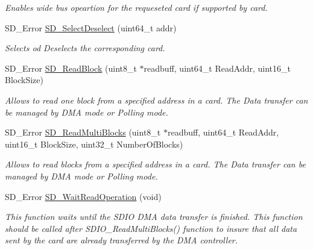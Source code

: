 \begin{DoxyCompactItemize}
\begin{DoxyCompactList}\small\item\em Enables wide bus opeartion for the requeseted card if supported by card. \end{DoxyCompactList}\item 
S\+D\+\_\+\+Error \hyperlink{group___s_t_m324x_g___e_v_a_l___s_d_i_o___s_d___private___functions_ga849eb0b385337453139a7567898dacb7}{S\+D\+\_\+\+Select\+Deselect} (uint64\+\_\+t addr)
\begin{DoxyCompactList}\small\item\em Selects od Deselects the corresponding card. \end{DoxyCompactList}\item 
S\+D\+\_\+\+Error \hyperlink{group___s_t_m324x_g___e_v_a_l___s_d_i_o___s_d___private___functions_ga1b2b4c1bf25da0771325b00cd638129d}{S\+D\+\_\+\+Read\+Block} (uint8\+\_\+t $\ast$readbuff, uint64\+\_\+t Read\+Addr, uint16\+\_\+t Block\+Size)
\begin{DoxyCompactList}\small\item\em Allows to read one block from a specified address in a card. The Data transfer can be managed by D\+MA mode or Polling mode. \end{DoxyCompactList}\item 
S\+D\+\_\+\+Error \hyperlink{group___s_t_m324x_g___e_v_a_l___s_d_i_o___s_d___private___functions_ga56b7336165f2631d9142a513ea2d0d17}{S\+D\+\_\+\+Read\+Multi\+Blocks} (uint8\+\_\+t $\ast$readbuff, uint64\+\_\+t Read\+Addr, uint16\+\_\+t Block\+Size, uint32\+\_\+t Number\+Of\+Blocks)
\begin{DoxyCompactList}\small\item\em Allows to read blocks from a specified address in a card. The Data transfer can be managed by D\+MA mode or Polling mode. \end{DoxyCompactList}\item 
S\+D\+\_\+\+Error \hyperlink{group___s_t_m324x_g___e_v_a_l___s_d_i_o___s_d___private___functions_ga42ab410b834d74d7f3ee757dc888b8cc}{S\+D\+\_\+\+Wait\+Read\+Operation} (void)
\begin{DoxyCompactList}\small\item\em This function waits until the S\+D\+IO D\+MA data transfer is finished. This function should be called after S\+D\+I\+O\+\_\+\+Read\+Multi\+Blocks() function to insure that all data sent by the card are already transferred by the D\+MA controller. \end{DoxyCompactList}\item 

\end{DoxyCompactItemize}
